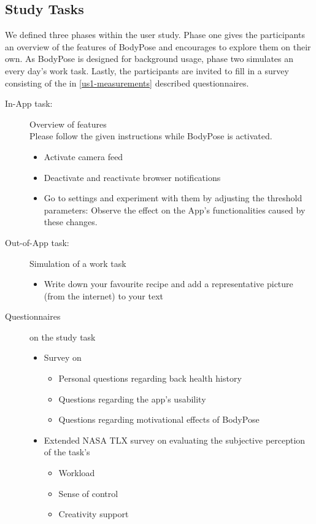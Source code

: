 \subsection{Study Tasks}
\label{us1-tasks}
We defined three phases within the user study. Phase one gives the participants an overview of the features of BodyPose and encourages to explore them on their own. As BodyPose is designed for background usage, phase two simulates an every day's work task. Lastly, the participants are invited to fill in a survey consisting of the in \ref{us1-measurements} described questionnaires.

\begin{description}
\item[In-App task:]  Overview of features\\
Please follow the given instructions while BodyPose is activated. 
\begin{itemize}
	\item Activate camera feed
	\item Deactivate and reactivate browser notifications
	\item Go to settings and experiment with them by adjusting the threshold parameters: Observe the effect on the App's functionalities caused by these changes.
\end{itemize}

\item[Out-of-App task:]  Simulation of a work task
\begin{itemize}
	\item Write down your favourite recipe and add a representative picture (from the internet) to your text
\end{itemize}

\item[Questionnaires] on the study task
\begin{itemize}
	\item Survey on
	\begin{itemize}
		\item Personal questions regarding back health history
	    \item Questions regarding the app's usability
		\item Questions regarding motivational effects of BodyPose
	\end{itemize}
	\item Extended NASA TLX survey on evaluating the subjective perception of the task's
	\begin{itemize}
		\item Workload
		\item Sense of control
		\item Creativity support
	\end{itemize}
\end{itemize}
\end{description}


